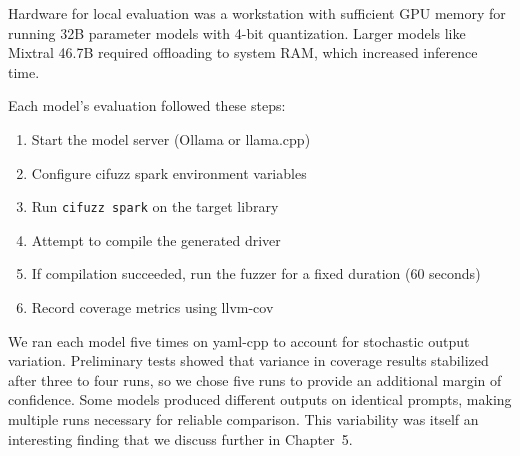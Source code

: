 Hardware for local evaluation was a workstation with sufficient GPU memory for running 32B parameter models with 4-bit quantization. Larger models like Mixtral 46.7B required offloading to system RAM, which increased inference time.

Each model's evaluation followed these steps:

\begin{enumerate}
    \item Start the model server (Ollama or llama.cpp)
    \item Configure cifuzz spark environment variables
    \item Run \texttt{cifuzz spark} on the target library
    \item Attempt to compile the generated driver
    \item If compilation succeeded, run the fuzzer for a fixed duration (60 seconds)
    \item Record coverage metrics using llvm-cov
\end{enumerate}

We ran each model five times on yaml-cpp to account for stochastic output variation. Preliminary tests showed that variance in coverage results stabilized after three to four runs, so we chose five runs to provide an additional margin of confidence. Some models produced different outputs on identical prompts, making multiple runs necessary for reliable comparison. This variability was itself an interesting finding that we discuss further in Chapter~5.

